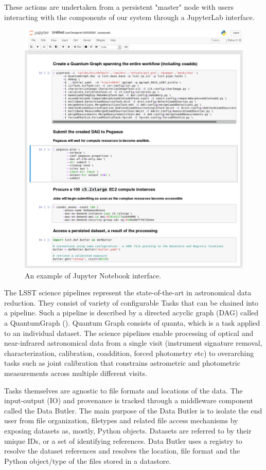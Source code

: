 \documentclass[a4paper, 10pt, conference]{ieeeconf}
\begin{document}
These actions are undertaken from a persistent "master" node with users interacting with the components of our system through a JupyterLab interface. 

\begin{figure}[htb]
\centering
\includegraphics[width=\columnwidth]{figures/JupyterNotebookFakery.png}
\caption{An example of Jupyter Notebook interface. }
\label{fig:techstack}
\end{figure}

The LSST science pipelines represent the state-of-the-art in astronomical data reduction. They consist of variety of configurable Tasks that can be chained into a pipeline. Such a pipeline is described by a directed acyclic graph (DAG) called a QuantumGraph (\cite{dmtn055}). Quantum Graph consists of quanta, which is a task applied to an individual dataset. The science pipelines enable processing of optical and near-infrared astronomical data from a single visit (instrument signature removal, characterization, calibration, coaddition, forced photometry etc) to overarching tasks such as joint calibration that constrains astrometric and photometric measurements across multiple different visits. 

Tasks themselves are agnostic to file formats and locations of the data. The input-output (IO) and provenance is tracked through a middleware component called the Data Butler. The main purpose of the Data Butler is to isolate the end user from file organization, filetypes and related file access mechanisms by exposing datasets as, mostly, Python objects. Datasets are referred to by their unique IDs, or a set of identifying references. Data Butler uses a registry to resolve the dataset references and resolves the location, file format and the Python object/type of the files stored in a datastore.
\end{document}
